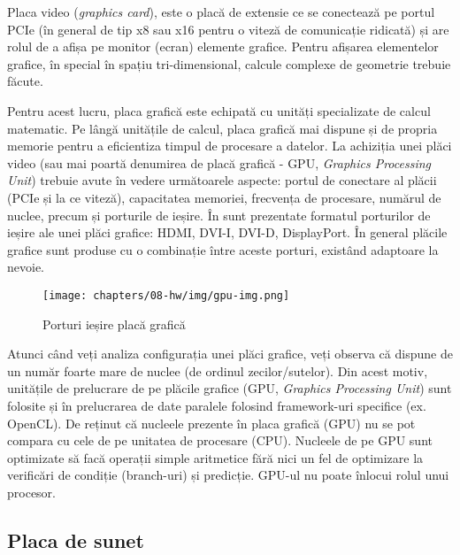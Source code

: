 Placa video (\textit{graphics card}), este o placă de extensie ce se conectează pe portul PCIe (în general
de tip x8 sau x16 pentru o viteză de comunicație ridicată) și are rolul de a
afișa pe monitor (ecran) elemente grafice. Pentru afișarea elementelor grafice,
în special în spațiu tri-dimensional, calcule complexe de geometrie trebuie
făcute.

Pentru acest lucru, placa grafică este echipată cu unități specializate
de calcul matematic. Pe lângă unitățile de calcul, placa grafică mai dispune și
de propria memorie pentru a eficientiza timpul de procesare a datelor. La
achiziția unei plăci video (sau mai poartă denumirea de placă grafică - GPU, \textit{Graphics Processing Unit}) trebuie avute în vedere următoarele
aspecte: portul de conectare al plăcii (PCIe și la ce viteză), capacitatea
memoriei, frecvența de procesare, numărul de nuclee, precum și porturile de
ieșire. În  sunt prezentate formatul
porturilor de ieșire ale unei plăci grafice: HDMI, DVI-I, DVI-D, DisplayPort. În
general plăcile grafice sunt produse cu o combinație între aceste porturi,
existând adaptoare la nevoie.

\begin{figure}[!htbp]
	\centering
	\texttt{[image: chapters/08-hw/img/gpu-img.png]}
	\caption{Porturi ieșire placă grafică\protect\footnotemark}
	\label{fig:hw:gpu}
\end{figure}


Atunci când veți analiza configurația unei plăci grafice, veți observa că
dispune de un număr foarte mare de nuclee (de ordinul zecilor/sutelor). Din
acest motiv, unitățile de prelucrare de pe plăcile grafice (GPU, \textit{Graphics Processing Unit}) sunt folosite și în prelucrarea de date
paralele folosind framework-uri specifice (ex. OpenCL). De reținut că nucleele
prezente în placa grafică (GPU) nu se pot compara cu cele de pe unitatea de
procesare (CPU). Nucleele de pe GPU sunt optimizate să facă operații simple
aritmetice fără nici un fel de optimizare la verificări de condiție (branch-uri)
și predicție. GPU-ul nu poate înlocui rolul unui procesor.

\subsection{Placa de sunet}
\label{sec:hw:extension:sound}

